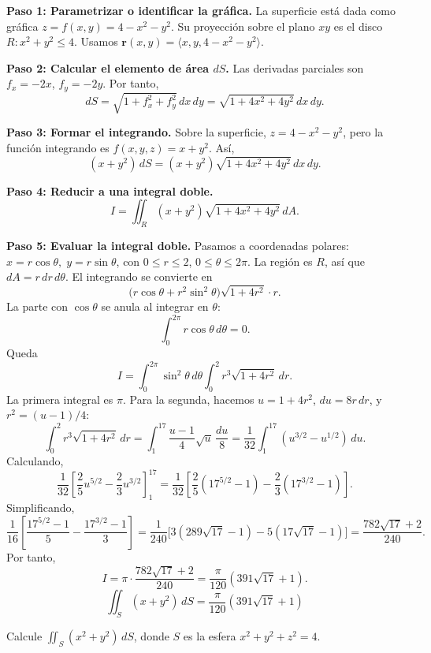 \begin{myproof}
\textbf{Paso 1: Parametrizar o identificar la gráfica.}
La superficie está dada como gráfica $z=f(x,y)=4-x^2-y^2$. Su proyección sobre el plano $xy$ es el disco $R: x^2+y^2 \le 4$. Usamos $\mathbf{r}(x,y)=\langle x,y,4-x^2-y^2\rangle$.

\textbf{Paso 2: Calcular el elemento de área $dS$.}
Las derivadas parciales son $f_x=-2x$, $f_y=-2y$. Por tanto,
\[
dS = \sqrt{1+f_x^2+f_y^2}\,dx\,dy
= \sqrt{1+4x^2+4y^2}\,dx\,dy.
\]

\textbf{Paso 3: Formar el integrando.}
Sobre la superficie, $z=4-x^2-y^2$, pero la función integrando es $f(x,y,z)=x+y^2$. Así,
\[
(x+y^2)\,dS = (x+y^2)\sqrt{1+4x^2+4y^2}\,dx\,dy.
\]

\textbf{Paso 4: Reducir a una integral doble.}
\[
I = \iint_R (x+y^2)\sqrt{1+4x^2+4y^2}\,dA.
\]

\textbf{Paso 5: Evaluar la integral doble.}
Pasamos a coordenadas polares: $x=r\cos\theta,\; y=r\sin\theta$, con $0\le r\le 2$, $0\le\theta\le 2\pi$. La región es $R$, así que $dA = r\,dr\,d\theta$. El integrando se convierte en
\[
\bigl(r\cos\theta + r^2\sin^2\theta\bigr)\sqrt{1+4r^2}\cdot r.
\]
La parte con $\cos\theta$ se anula al integrar en $\theta$:
\[
\int_0^{2\pi} r\cos\theta \, d\theta = 0.
\]
Queda
\[
I = \int_0^{2\pi}\sin^2\theta\,d\theta \int_0^2 r^3\sqrt{1+4r^2}\,dr.
\]
La primera integral es $\pi$. Para la segunda, hacemos $u=1+4r^2$, $du=8r\,dr$, y $r^2=(u-1)/4$:
\[
\int_0^2 r^3\sqrt{1+4r^2}\,dr
= \int_1^{17} \frac{u-1}{4}\sqrt{u}\,\frac{du}{8}
= \frac{1}{32}\int_1^{17} (u^{3/2}-u^{1/2})\,du.
\]
Calculando,
\[
\frac{1}{32}\left[\frac{2}{5}u^{5/2}-\frac{2}{3}u^{3/2}\right]_1^{17}
= \frac{1}{32}\left[\frac{2}{5}(17^{5/2}-1)-\frac{2}{3}(17^{3/2}-1)\right].
\]
Simplificando,
\[
\frac{1}{16}\left[\frac{17^{5/2}-1}{5}-\frac{17^{3/2}-1}{3}\right]
= \frac{1}{240}\bigl[3(289\sqrt{17}-1)-5(17\sqrt{17}-1)\bigr]
= \frac{782\sqrt{17}+2}{240}.
\]
Por tanto,
\[
I = \pi \cdot \frac{782\sqrt{17}+2}{240}
= \frac{\pi}{120}(391\sqrt{17}+1).
\]
\[
\boxed{\displaystyle \iint_S (x+y^2)\,dS = \frac{\pi}{120}(391\sqrt{17}+1)}
\]
\end{myproof}

\begin{example}
Calcule $\displaystyle \iint_S (x^2+y^2)\,dS$, donde $S$ es la esfera $x^2+y^2+z^2=4$.
\end{example}

